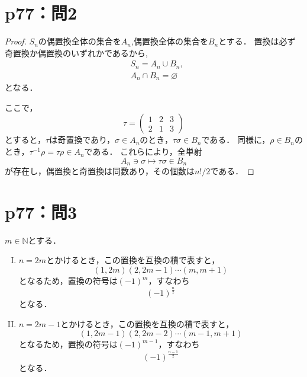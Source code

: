 \documentclass[a4paper,10pt,fleqn]{ltjsarticle}
\begin{document}
\section*{p77：問2}

\begin{tleftbar}
    \begin{proof}
        $S_n$の偶置換全体の集合を$A_n$,偶置換全体の集合を$B_n$とする．
        置換は必ず奇置換か偶置換のいずれかであるから,
        \begin{align*}
             & S_n = A_n \cup B_n ,       \\
             & A_n \cap B_n = \varnothing
        \end{align*}
        となる．

        ここで，
        \[
            \tau = \begin{pmatrix} 1 & 2 & 3 \\ 2 & 1 & 3 \end{pmatrix}
        \]
        とすると，$\tau$は奇置換であり，$\sigma \in  A_n$のとき，$ \tau \sigma \in B_n$である．
        同様に，$ \rho  \in B_n$のとき，$\tau^{-1} \rho = \tau \rho \in A_n$である．
        これらにより，全単射
        \[
            A_n \ni \sigma \mapsto \tau \sigma \in B_n
        \]
        が存在し，偶置換と奇置換は同数あり，その個数は$n! /2$である．
    \end{proof}
\end{tleftbar}


\section*{p77：問3}

\begin{leftbar}
    $m \in \mathbb{N}$とする．
    \begin{enumerate}[(I)]
        \item $n=2m$とかけるとき，この置換を互換の積で表すと，
              \[
                  (1,2m)(2,2m-1) \dotsm (m,m+1)
              \]
              となるため，置換の符号は$(-1)^m$，すなわち
              \[
                  (-1)^{\frac{n}{2}}
              \]
              となる．
        \item $n=2m-1$とかけるとき，この置換を互換の積で表すと，
              \[
                  (1,2m-1)(2,2m-2) \dotsm (m-1,m+1)
              \]
              となるため，置換の符号は$(-1)^{m-1}$，すなわち
              \[
                  (-1)^{\frac{n-1}{2}}
              \]
              となる．
    \end{enumerate}
\end{leftbar}
\end{document}
